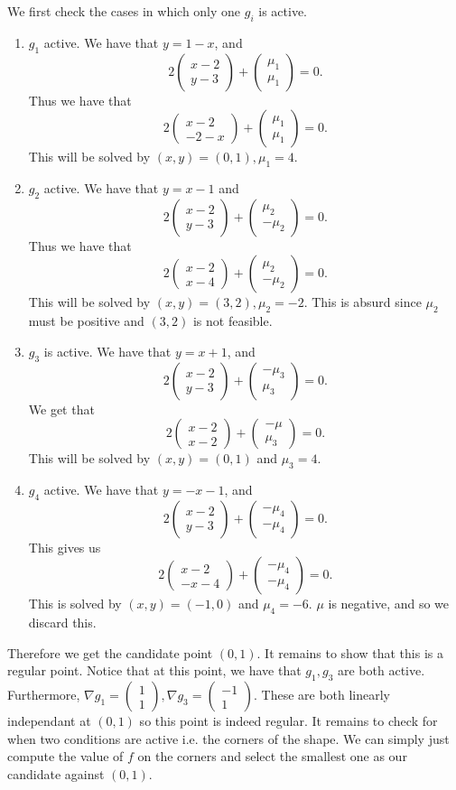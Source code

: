 \documentclass[12pt, a4paper]{article}
\theoremstyle{definition}
\newcommand{\grad}{\nabla}
\newcommand{\pmat}[1]{\begin{pmatrix}#1\end{pmatrix}}
\begin{document}
We first check the cases in which only one $g_i$ is active.
\begin{enumerate}[label =\bf{ Case \roman*)}]
	\item $g_1$ active. We have that $y = 1-x$, and 
		$$ 2 \pmat{x-2 \\ y-3} + \pmat{\mu_1 \\ \mu_1} = 0 .$$
		Thus we have that 
		$$ 2 \pmat{x-2 \\ -2-x} + \pmat{\mu_1 \\ \mu_1} = 0.$$ 
		This will be solved by $(x,y) = (0,1), \mu_1 = 4$. 
	\item $g_2$ active. We have that $y = x-1$ and 
$$ 2 \pmat{x-2 \\ y-3} + \pmat{\mu_2 \\- \mu_2} = 0 .$$
Thus we have that 
		$$2 \pmat{x-2 \\ x-4 } + \pmat{\mu_2 \\ -\mu_2} = 0.$$
		This will be solved by $(x,y) = (3,2), \mu_2 = -2$. This is absurd since $\mu_2$ must be positive and $(3,2)$ is not feasible. 
	\item $g_3$ is active. We have that $y = x+1$, and 
		$$2 \pmat{x-2 \\ y-3} + \pmat{-\mu_3 \\ \mu_3} = 0.$$
		We get that 
		$$2 \pmat{x -2 \\ x - 2} + \pmat{-\mu \\ \mu_3} = 0.$$
		This will be solved by $(x,y) = (0,1)$ and $\mu_3 = 4$. 
	\item $g_4$ active. We have that $y = -x-1$, and 
		$$2\pmat{x-2 \\ y-3 } + \pmat{-\mu_4 \\ -\mu_4} = 0. $$
		This gives us
		$$2 \pmat{x-2 \\-x - 4 } + \pmat{-\mu_4 \\ -\mu_4} =0 . $$
		This is solved by $(x,y) = (-1,0)$ and $\mu_4 = -6$. $\mu$ is negative, and so we discard this. 
\end{enumerate}
Therefore we get the candidate point $(0,1)$. It remains to show that this is a regular point. Notice that at this point, we have that $g_1,g_3$ are both active. 
Furthermore, $\grad g_1 = \pmat{1 \\ 1}, \grad g_3 = \pmat{-1 \\ 1}$. These are both linearly independant at $(0,1)$ so this point is indeed regular. 
It remains to check for when two conditions are active i.e. the corners of the shape. 
We can simply just compute the value of $f$ on the corners and select the smallest one as our candidate against $(0,1)$. 
\end{document}
